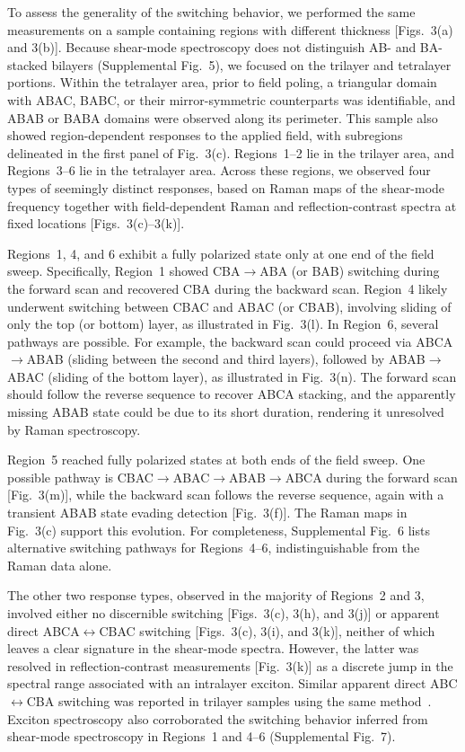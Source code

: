\documentclass[
reprint,
superscriptaddress,









 amsmath,amssymb,
 aps,
 prb,






]{revtex4-2}
\begin{document}
To assess the generality of the switching behavior, we performed the same measurements on a sample containing regions with different thickness [Figs.~3(a) and 3(b)]. Because shear-mode spectroscopy does not distinguish AB- and BA-stacked bilayers (Supplemental Fig.~5), we focused on the trilayer and tetralayer portions. Within the tetralayer area, prior to field poling, a triangular domain with ABAC, BABC, or their mirror-symmetric counterparts was identifiable, and ABAB or BABA domains were observed along its perimeter. This sample also showed region-dependent responses to the applied field, with subregions delineated in the first panel of Fig.~3(c). Regions~1--2 lie in the trilayer area, and Regions~3--6 lie in the tetralayer area. Across these regions, we observed four types of seemingly distinct responses, based on Raman maps of the shear-mode frequency together with field-dependent Raman and reflection-contrast spectra at fixed locations [Figs.~3(c)--3(k)].

Regions~1, 4, and 6 exhibit a fully polarized state only at one end of the field sweep. Specifically, Region~1 showed CBA$\rightarrow$ABA (or BAB) switching during the forward scan and recovered CBA during the backward scan. Region~4 likely underwent switching between CBAC and ABAC (or CBAB), involving sliding of only the top (or bottom) layer, as illustrated in Fig.~3(l). In Region~6, several pathways are possible. For example, the backward scan could proceed via ABCA$\rightarrow$ABAB (sliding between the second and third layers), followed by ABAB$\rightarrow$ABAC (sliding of the bottom layer), as illustrated in Fig.~3(n). The forward scan should follow the reverse sequence to recover ABCA stacking, and the apparently missing ABAB state could be due to its short duration, rendering it unresolved by Raman spectroscopy.

Region~5 reached fully polarized states at both ends of the field sweep. One possible pathway is CBAC$\rightarrow$ABAC$\rightarrow$ABAB$\rightarrow$ABCA during the forward scan [Fig.~3(m)], while the backward scan follows the reverse sequence, again with a transient ABAB state evading detection [Fig.~3(f)]. The Raman maps in Fig.~3(c) support this evolution. For completeness, Supplemental Fig.~6 lists alternative switching pathways for Regions~4--6, indistinguishable from the Raman data alone.

The other two response types, observed in the majority of Regions~2 and 3, involved either no discernible switching [Figs.~3(c), 3(h), and 3(j)] or apparent direct ABCA$\leftrightarrow$CBAC switching [Figs.~3(c), 3(i), and 3(k)], neither of which leaves a clear signature in the shear-mode spectra. However, the latter was resolved in reflection-contrast measurements [Fig.~3(k)] as a discrete jump in the spectral range associated with an intralayer exciton. Similar apparent direct ABC$\leftrightarrow$CBA switching was reported in trilayer samples using the same method~\cite{Liang2025}. Exciton spectroscopy also corroborated the switching behavior inferred from shear-mode spectroscopy in Regions~1 and 4--6 (Supplemental Fig.~7).
\end{document}
